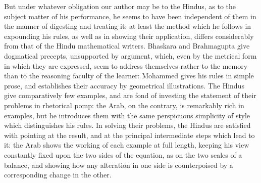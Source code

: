 But under whatever obligation our author may be to the Hindus, as to the subject matter of his performance, he seems to have been independent of them in the manner of digesting and treating it: at least the method which he follows in expounding his rules, as well as in showing their application, differs considerably from that of the Hindu mathematical writers. Bhaskara and Brahmagupta give dogmatical precepts, unsupported by argument, which, even by the metrical form in which they are expressed, seem to address themselves rather to the memory than to the reasoning faculty of the learner: Mohammed gives his rules in simple prose, and establishes their accuracy by geometrical illustrations. The Hindus give comparatively few examples, and are fond of investing the statement of their problems in rhetorical pomp: the Arab, on the contrary, is remarkably rich in examples, but he introduces them with the same perspicuous simplicity of style which distinguishes his rules. In solving their problems, the Hindus are satisfied with pointing at the result, and at the principal intermediate steps which lead to it: the Arab shows the working of each example at full length, keeping his view constantly fixed upon the two sides of the equation, as on the two scales of a balance, and showing how any alteration in one side is counterpoised by a corresponding change in the other.

